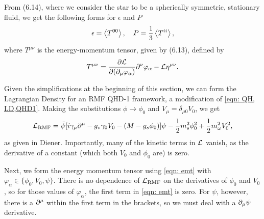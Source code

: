 From \autocite[p. 40]{diener_2008} (6.14), where we consider the star to be a spherically symmetric, stationary fluid, we get the following forms for $\epsilon$ and $P$
\begin{align}\label{eqn: eps and P defs}
    \epsilon = \expval{T^{00}}, \quad P = \frac{1}{3}\expval{T^{ii}},
\end{align}
where $T^{\mu\nu}$ is the energy-momentum tensor, given by \autocite[p. 40]{diener_2008} (6.13), defined by 
\begin{align}\label{eqn: emt}
    T^{\mu\nu} = \pdv{\mathcal{L}}{(\partial_\mu \varphi_\alpha)}\partial^\nu \varphi_\alpha - \mathcal{L} \eta^{\mu\nu}.
\end{align}

Given the simplifications at the beginning of this section, we can form the Lagrangian Density for an RMF QHD-1 framework, a modification of \eqref{eqn: QH, LD,QHD1}. Making the substitutions $\phi\to \phi_0$ and $V_\mu = \delta_{\mu 0 } V_0$, we get
\begin{align}
    \Lag_\text{RMF} = \bar\psi \bqty{i\gamma_\mu\p^\mu - g_v \gamma_0 V_0 - (M-g_s\phi_0)} \psi - \frac{1}{2} m_s^2 \phi_0^2 + \frac{1}{2} m_\omega^2 V_0^2,
\end{align}
as given in Diener. Importantly, many of the kinetic terms in $\mathcal{L}$ vanish, as the derivative of a constant (which both $V_0$ and $\phi_0$ are) is zero. 

Next, we form the energy momentum tensor using \eqref{eqn: emt} with $\varphi_\alpha \in \{ \phi_0, V_0, \psi\}$. There is no dependence of $\mathcal{L}_\text{RMF}$ on the derivatives of $\phi_0$ and $V_0$, so for those values of $\varphi_\alpha$, the first term in \eqref{eqn: emt} is zero. For $\psi$, however, there is a $\partial^\mu$ within the first term in the brackets, so we must deal with a $\partial_\mu \psi$ derivative. 

